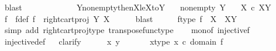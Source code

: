 \begin{isabellebody}
\ blast\isanewline
\ \ \ \ \isamarkupfalse%
\isanewline
\ \ \isamarkupfalse%
\ \ \isanewline
\ \isamarkupfalse%
\isanewline
{}\isamarkupfalse%
%
\endisatagproof
{\isafoldproof}%
%
\isadelimproof
\isanewline
%
\endisadelimproof
\isanewline
{}\isamarkupfalse%
\ Y{\isacharunderscore}{\kern0pt}nonempty{\isacharunderscore}{\kern0pt}then{\isacharunderscore}{\kern0pt}X{\isacharunderscore}{\kern0pt}le{\isacharunderscore}{\kern0pt}XtoY{\isacharcolon}{\kern0pt}\isanewline
\ \ \ {\isachardoublequoteopen}nonempty\ Y{\isachardoublequoteclose}\isanewline
\ \ \ {\isachardoublequoteopen}X\ {\isasymle}\isactrlsub c\ X\isactrlbsup Y\isactrlesup {\isachardoublequoteclose}\isanewline
%
\isadelimproof
%
\endisadelimproof
%
\isatagproof
{}\isamarkupfalse%
\ {\isacharminus}{\kern0pt}\ \isanewline
\ \ \isamarkupfalse%
\ f\ \ f{\isacharunderscore}{\kern0pt}def{\isacharcolon}{\kern0pt}\ {\isachardoublequoteopen}f\ {\isacharequal}{\kern0pt}\ {\isacharparenleft}{\kern0pt}right{\isacharunderscore}{\kern0pt}cart{\isacharunderscore}{\kern0pt}proj\ Y\ X{\isacharparenright}{\kern0pt}\isactrlsup {\isasymsharp}{\isachardoublequoteclose}\isanewline
\ \ \ \ \isamarkupfalse%
\ blast\isanewline
\ \ \isamarkupfalse%
\ \isamarkupfalse%
\ f{\isacharunderscore}{\kern0pt}type{\isacharcolon}{\kern0pt}\ {\isachardoublequoteopen}f\ {\isacharcolon}{\kern0pt}\ X\ {\isasymrightarrow}\ X\isactrlbsup Y\isactrlesup {\isachardoublequoteclose}\isanewline
\ \ \ \ \isamarkupfalse%
\ {\isacharparenleft}{\kern0pt}simp\ add{\isacharcolon}{\kern0pt}\ right{\isacharunderscore}{\kern0pt}cart{\isacharunderscore}{\kern0pt}proj{\isacharunderscore}{\kern0pt}type\ transpose{\isacharunderscore}{\kern0pt}func{\isacharunderscore}{\kern0pt}type{\isacharparenright}{\kern0pt}\isanewline
\ \ \isamarkupfalse%
\ mono{\isacharunderscore}{\kern0pt}f{\isacharcolon}{\kern0pt}\ {\isachardoublequoteopen}injective{\isacharparenleft}{\kern0pt}f{\isacharparenright}{\kern0pt}{\isachardoublequoteclose}\isanewline
\ \ \ \ \isamarkupfalse%
\ injective{\isacharunderscore}{\kern0pt}def\isanewline
\ \ \isamarkupfalse%
{\isacharparenleft}{\kern0pt}clarify{\isacharparenright}{\kern0pt}\isanewline
\ \ \ \ \isamarkupfalse%
\ x\ y\ \isanewline
\ \ \ \ \isamarkupfalse%
\ x{\isacharunderscore}{\kern0pt}type{\isacharcolon}{\kern0pt}\ {\isachardoublequoteopen}x\ {\isasymin}\isactrlsub c\ domain\ f{\isachardoublequoteclose}\isanewline

\end{isabellebody}
